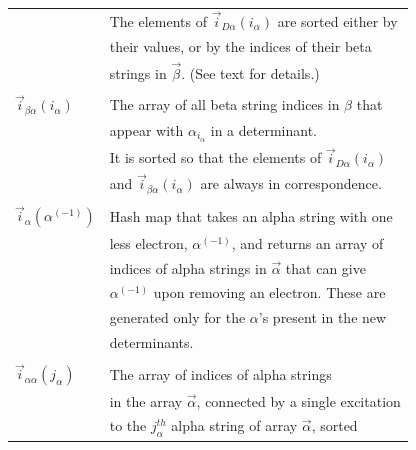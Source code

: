 \documentclass[%
reprint,
 superscriptaddress,
 amsmath,amssymb,
 aps,
]{revtex4-1}
\def\V{\mathcal{V}}
\def\veca{\vec{\alpha}}
\def\vecb{\vec{\beta}}
\def\ia{i_\alpha}
\def\ib{i_\beta}
\def\vecia{\vec{i}_\alpha}
\def\veciDa{\vec{i}_{D\alpha}}
\def\veciaa{\vec{i}_{\alpha\alpha}}
\def\veciba{\vec{i}_{\beta\alpha}}
\begin{document}
\begin{table}[h]
\begin{tabular}{ll}
& The elements of $\veciDa(\ia)$ are sorted either by\\
& their values, or by the indices of their beta \\
& strings in $\vecb$. (See text for details.)\\
&\\
$\veciba(\ia)$ & The array of all beta string indices in $\beta$ that\\
& appear with $\alpha_{\ia}$ in a determinant. \\
& It is sorted so that the elements of $\veciDa(\ia)$ \\
& and $\veciba(\ia)$ are always in correspondence.\\
&\\
$\vecia(\alpha^{(-1)})$ & Hash map that takes an alpha string with one \\
& less electron, $\alpha^{(-1)}$, and returns an array of  \\
& indices of alpha strings in $\veca$ that can give  \\
& $\alpha^{(-1)}$ upon removing an electron.  These are \\
& generated only for the $\alpha$'s present in the new \\
& determinants.\\
&\\
$\veciaa(j_\alpha)$ & The array of indices of alpha strings \\
& in the array $\veca$, connected by a single excitation \\
& to the $j_\alpha^{th}$ alpha string of array $\veca$, sorted \\

\end{tabular}
\end{table}
\end{document}
